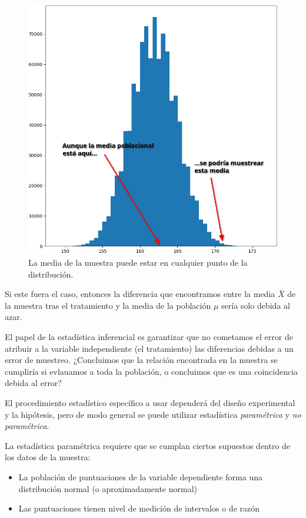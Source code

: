 \documentclass[a4paper,12pt]{article}
\begin{document}
\begin{figure}[!ht]
  \begin{center}
    \includegraphics[scale=0.5]{curvaNormal.png}
    \caption{La media de la muestra puede estar en cualquier punto de la distribución.}
  \end{center}
\end{figure}

Si este fuera el caso, entonces la diferencia que encontramos entre la media $\bar{X}$ de la muestra tras el tratamiento y la media de la población $\mu$ sería solo debida al azar.

El papel de la estadística inferencial es garantizar que no cometamos el error de atribuir a la variable independiente (el tratamiento) las diferencias debidas a un error de muestreo. ¿Concluimos que la relación encontrada en la muestra se cumpliría si evlauamos a toda la población, o concluimos que es una coincidencia debida al error?

El procedimiento estadístico específico a usar dependerá del diseño experimental y la hipótesis, pero de modo general se puede utilizar estadística {\itshape paramétrica} y {\itshape no paramétrica}.

La estadística paramétrica requiere que se cumplan ciertos supuestos dentro de los datos de la muestra:
\begin{itemize}
  \item La población de puntuaciones de la variable dependiente forma una distribución normal (o aproximadamente normal)
  \item Las puntuaciones tienen nivel de medición de intervalos o de razón
\end{itemize}
\end{document}
